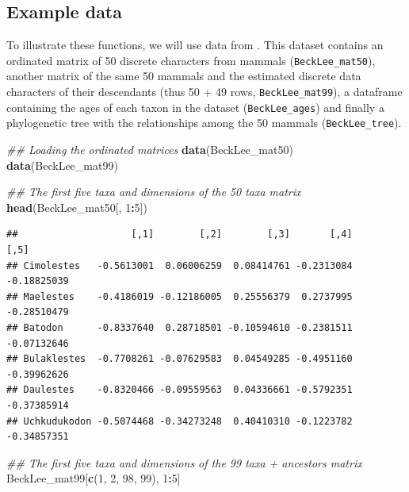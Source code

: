 \documentclass[]{book}
\newenvironment{Shaded}{\begin{snugshade}}{\end{snugshade}}
\newcommand{\CommentTok}[1]{\textcolor[rgb]{0.56,0.35,0.01}{\textit{#1}}}
\newcommand{\DecValTok}[1]{\textcolor[rgb]{0.00,0.00,0.81}{#1}}
\newcommand{\KeywordTok}[1]{\textcolor[rgb]{0.13,0.29,0.53}{\textbf{#1}}}
\newcommand{\NormalTok}[1]{#1}
\newcommand{\OperatorTok}[1]{\textcolor[rgb]{0.81,0.36,0.00}{\textbf{#1}}}
\begin{document}
\hypertarget{example-data}{%
\subsection{Example data}\label{example-data}}

To illustrate these functions, we will use data from \citet{beckancient2014}.
This dataset contains an ordinated matrix of 50 discrete characters from mammals (\texttt{BeckLee\_mat50}), another matrix of the same 50 mammals and the estimated discrete data characters of their descendants (thus 50 + 49 rows, \texttt{BeckLee\_mat99}), a dataframe containing the ages of each taxon in the dataset (\texttt{BeckLee\_ages}) and finally a phylogenetic tree with the relationships among the 50 mammals (\texttt{BeckLee\_tree}).

\begin{Shaded}
\begin{Highlighting}[]
\CommentTok{## Loading the ordinated matrices}
\KeywordTok{data}\NormalTok{(BeckLee_mat50)}
\KeywordTok{data}\NormalTok{(BeckLee_mat99)}

\CommentTok{## The first five taxa and dimensions of the 50 taxa matrix}
\KeywordTok{head}\NormalTok{(BeckLee_mat50[, }\DecValTok{1}\OperatorTok{:}\DecValTok{5}\NormalTok{])}
\end{Highlighting}
\end{Shaded}

\begin{verbatim}
##                    [,1]        [,2]        [,3]       [,4]        [,5]
## Cimolestes   -0.5613001  0.06006259  0.08414761 -0.2313084 -0.18825039
## Maelestes    -0.4186019 -0.12186005  0.25556379  0.2737995 -0.28510479
## Batodon      -0.8337640  0.28718501 -0.10594610 -0.2381511 -0.07132646
## Bulaklestes  -0.7708261 -0.07629583  0.04549285 -0.4951160 -0.39962626
## Daulestes    -0.8320466 -0.09559563  0.04336661 -0.5792351 -0.37385914
## Uchkudukodon -0.5074468 -0.34273248  0.40410310 -0.1223782 -0.34857351
\end{verbatim}

\begin{Shaded}
\begin{Highlighting}[]
\CommentTok{## The first five taxa and dimensions of the 99 taxa + ancestors matrix}
\NormalTok{BeckLee_mat99[}\KeywordTok{c}\NormalTok{(}\DecValTok{1}\NormalTok{, }\DecValTok{2}\NormalTok{, }\DecValTok{98}\NormalTok{, }\DecValTok{99}\NormalTok{), }\DecValTok{1}\OperatorTok{:}\DecValTok{5}\NormalTok{]}
\end{Highlighting}
\end{Shaded}
\end{document}
